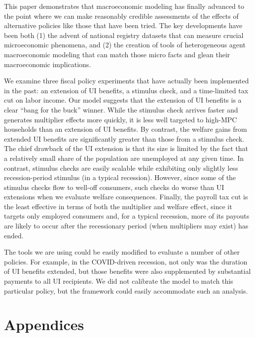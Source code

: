 \documentclass[qe]{econsocart}
\begin{document}
This paper demonstrates that macroeconomic modeling has finally advanced to the point where we can make reasonably credible assessments of the effects of alternative policies like those that have been tried.  The key developments have been both (1) the advent of national registry datasets that can measure crucial microeconomic phenomena, and (2) the creation of tools of heterogeneous agent macroeconomic modeling that can match those micro facts and glean their macroeconomic implications.

We examine three fiscal policy experiments that have actually been implemented in the past: an extension of UI benefits, a stimulus check, and a time-limited tax cut on labor income.  Our model suggests that the extension of UI benefits is a clear ``bang for the buck'' winner.  While the stimulus check arrives faster and generates multiplier effects more quickly, it is less well targeted to high-MPC households than an extension of UI benefits. By contrast, the welfare gains from extended UI benefits are significantly greater than those from a stimulus check. The chief drawback of the UI extension is that its size is limited by the fact that a relatively small share of the population are unemployed at any given time. In contrast, stimulus checks are easily scalable while exhibiting only slightly less recession-period stimulus (in a typical recession). However, since some of the stimulus checks flow to well-off consumers, such checks do worse than UI extensions when we evaluate welfare consequences. Finally, the payroll tax cut is the least effective in terms of both the multiplier and welfare effect, since it targets only employed consumers and, for a typical recession, more of its payouts are likely to occur after the recessionary period (when multipliers may exist) has ended.

The tools we are using could be easily modified to evaluate a number of other policies.  For example, in the COVID-driven recession, not only was the duration of UI benefits extended, but those benefits were also supplemented by substantial payments to all UI recipients.  We did not calibrate the model to match this particular policy, but the framework could easily accommodate such an analysis.

\clearpage

\section*{Appendices}
\end{document}
